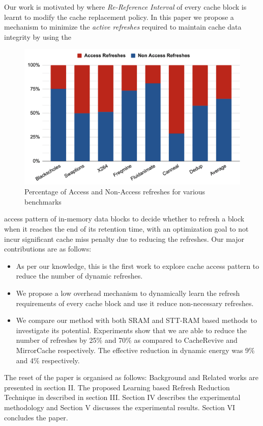 \documentclass[sigconf]{acmart}
\begin{document}
Our work is motivated by \cite{rrip} where \textit{Re-Reference Interval} of every cache block is learnt to modify the cache replacement policy. In this paper we propose a mechanism to minimize the \textit{active refreshes} required to maintain cache data integrity by using the
\begin{figure}[]
\includegraphics[width=\columnwidth]{res/ref_percentage.png}
\caption{Percentage of Access and Non-Access refreshes for various benchmarks}
\end{figure}
access pattern of in-memory data blocks to decide whether to refresh a block when it reaches the end of its retention time, with an optimization goal to not incur significant cache miss penalty due to reducing the refreshes. Our major contributions are as follows:
\begin{itemize}
  \item As per our knowledge, this is the first work to explore cache access pattern to reduce the number of dynamic refreshes.
  \item We propose a low overhead mechanism to dynamically learn the refresh requirements of every cache block and use it reduce non-necessary refreshes.
  \item We compare our method with both SRAM and STT-RAM based methods to investigate its potential. Experiments show that we are able to reduce the number of refreshes by 25\% and 70\% as compared to CacheRevive and MirrorCache respectively. The effective reduction in dynamic energy was 9\% and 4\% respectively.
\end{itemize}

The reset of the paper is organised as follows: Background and Related works are presented in section II. The proposed Learning based Refresh Reduction Technique in described in section III. Section IV describes the experimental methodology and Section V discusses the experimental results. Section VI concludes the paper.
\end{document}
